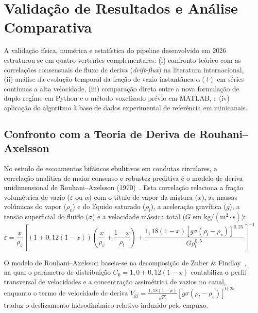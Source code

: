 \section{Validação de Resultados e Análise Comparativa}
\label{sec:validacao}

A validação física, numérica e estatística do pipeline desenvolvido em 2026 estruturou-se em quatro vertentes complementares: (i) confronto teórico com as correlações consensuais de fluxo de deriva (\emph{drift-flux}) na literatura internacional, (ii) análise da evolução temporal da fração de vazio instantânea $\alpha(t)$ em séries contínuas a alta velocidade, (iii) comparação direta entre a nova formulação de duplo regime em Python e o método voxelizado prévio em MATLAB, e (iv) aplicação do algoritmo à base de dados experimental de referência em minicanais.

\subsection{Confronto com a Teoria de Deriva de Rouhani--Axelsson}
\label{subsec:validacao_rouhani}

No estudo de escoamentos bifásicos ebulitivos em condutas circulares, a correlação analítica de maior consenso e robustez preditiva é o modelo de deriva unidimensional de Rouhani--Axelsson (1970)~\cite{rouhani1970calculation}. Esta correlação relaciona a fração volumétrica de vazio ($\varepsilon$ ou $\alpha$) com o título de vapor da mistura ($x$), as massas volúmicas do vapor ($\rho_v$) e do líquido saturado ($\rho_l$), a aceleração gravítica ($g$), a tensão superficial do fluido ($\sigma$) e a velocidade mássica total ($G$ em $\mathrm{kg/(m^2\cdot s)}$):
\begin{equation}
    \varepsilon = \frac{x}{\rho_v} \left[ \left(1 + 0{,}12(1 - x)\right) \left(\frac{x}{\rho_v} + \frac{1 - x}{\rho_l}\right) + \frac{1{,}18(1 - x) \left[ g \sigma (\rho_l - \rho_v) \right]^{0{,}25}}{G \rho_l^{0{,}5}} \right]^{-1}
    \label{eq:rouhani_axelsson}
\end{equation}

O modelo de Rouhani--Axelsson baseia-se na decomposição de Zuber \& Findlay~\cite{rouhani1970calculation}, na qual o parâmetro de distribuição $C_0 = 1{,}0 + 0{,}12(1-x)$ contabiliza o perfil transversal de velocidades e a concentração assimétrica de vazios no canal, enquanto o termo de velocidade de deriva $V_{gj} = \frac{1{,}18(1-x)}{\sqrt{\rho_l}} [g\sigma(\rho_l-\rho_v)]^{0{,}25}$ traduz o deslizamento hidrodinâmico relativo induzido pelo empuxo.

